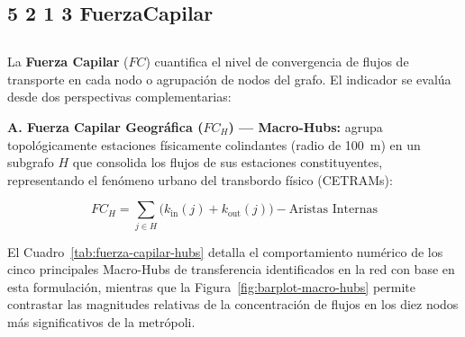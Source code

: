 \subsection*{5 2 1 3 FuerzaCapilar}
\subsection{}
\label{subsec:fuerza-capilar}

La \textbf{Fuerza Capilar} ($FC$) cuantifica el nivel de convergencia de flujos
de transporte en cada nodo o agrupación de nodos del grafo. El indicador se
evalúa desde dos perspectivas complementarias:

\textbf{A. Fuerza Capilar Geográfica ($FC_H$) — Macro-Hubs:} agrupa
topológicamente estaciones físicamente colindantes (radio de 100~m) en un
subgrafo $H$ que consolida los flujos de sus estaciones constituyentes,
representando el fenómeno urbano del transbordo físico (CETRAMs):

\begin{equation}
    FC_{H} = \sum_{j \in H} \bigl(k_{\text{in}}(j) + k_{\text{out}}(j)\bigr)
    - \text{Aristas Internas}
    \label{eq:fc-geografica}
\end{equation}

El Cuadro~\ref{tab:fuerza-capilar-hubs} detalla el comportamiento numérico de los
cinco principales Macro-Hubs de transferencia identificados en la red con base en
esta formulación, mientras que la Figura~\ref{fig:barplot-macro-hubs} permite
contrastar las magnitudes relativas de la concentración de flujos en los diez
nodos más significativos de la metrópoli.

